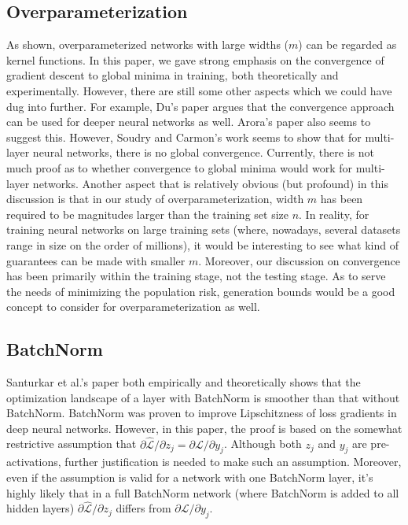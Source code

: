 \documentclass{article}
\begin{document}
\subsection{Overparameterization}
As shown, overparameterized networks with large widths ($m$) can be regarded as kernel functions. In this paper, we gave strong emphasis on the convergence of gradient descent to global minima in training, both theoretically and experimentally. However, there are still some other aspects which we could have dug into further. For example, Du's\cite{SimonDu} paper argues that the convergence approach can be used for deeper neural networks as well. Arora's \cite{Arora} paper also seems to suggest this. However, Soudry and Carmon's \cite{SoudryCarmon} work seems to show that for multi-layer neural networks, there is no global convergence. Currently, there is not much proof as to whether convergence to global minima would work for multi-layer networks. Another aspect that is relatively obvious (but profound) in this discussion is that in our study of overparameterization, width $m$ has been required to be magnitudes larger than the training set size $n$. In reality, for training neural networks on large training sets (where, nowadays, several datasets range in size on the order of millions), it would be interesting to see what kind of guarantees can be made with smaller $m$. Moreover, our discussion on convergence has been primarily within the training stage, not the testing stage. As to serve the needs of minimizing the population risk, generation bounds would be a good concept to consider for overparameterization as well. 


\subsection{BatchNorm}
Santurkar et al.'s paper \cite{landscape} both empirically and theoretically shows that the optimization landscape of a layer with BatchNorm is smoother than that without BatchNorm. BatchNorm was proven to improve Lipschitzness of loss gradients in deep neural networks. However, in this paper, the proof is based on the somewhat restrictive assumption that $\partial\hat{\mathcal{L}}/\partial z_j = \partial\mathcal{L}/\partial y_j$. Although both $z_j$ and $y_j$ are pre-activations, further justification is needed to make such an assumption. Moreover, even if the assumption is valid for a network with one BatchNorm layer, it's highly likely that in a full BatchNorm network (where BatchNorm is added to all hidden layers) $\partial\hat{\mathcal{L}}/\partial z_j$ differs from $\partial\mathcal{L}/\partial y_j$.
\end{document}
